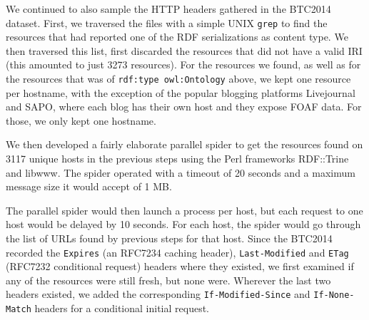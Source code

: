 \documentclass{article}
\newcommand{\rdfterm}[1]{\texttt{#1}}
\newcommand{\httph}[1]{\texttt{#1}}
\begin{document}
We continued to also sample the HTTP headers gathered in the BTC2014
dataset. 
First, we traversed the files with a simple UNIX \texttt{grep} to find
the resources that had reported one of the RDF serializations as
content type. We then traversed this list, first discarded the
resources that did not have a valid IRI (this amounted to just 3273
resources). For the resources we found, as well as for the resources
that was of \rdfterm{rdf:type owl:Ontology} above, we kept one
resource per hostname, with the exception of the popular blogging
platforms Livejournal and SAPO, where each blog has their own host and
they expose FOAF data. For those, we only kept one hostname. 

We then developed a fairly elaborate parallel spider to get the
resources found on 3117 unique hosts in the previous steps using the
Perl frameworks RDF::Trine and libwww. The spider operated with a
timeout of 20 seconds and a maximum message size it would accept of 1
MB. 

The parallel spider would then launch a process per host, but each
request to one host would be delayed by 10 seconds. For each host, the
spider would go through the list of URLs found by previous steps for
that host. Since the BTC2014 recorded
the \httph{Expires} (an RFC7234 caching header), \httph{Last-Modified}
and \httph{ETag} (RFC7232 conditional request) headers where they
existed, we first examined if any of the resources were still fresh,
but none were. Wherever the last two headers existed, we added the
corresponding \httph{If-Modified-Since} and \httph{If-None-Match}
headers for a conditional initial request.
\end{document}
